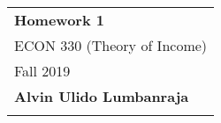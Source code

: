 \documentclass[letter,10pt]{article}
\begin{document}
\thispagestyle{empty} %
\begin{tabular}{p{17cm}} %
{\large \bf Homework 1} \\
ECON 330 (Theory of Income) \\ Fall 2019  \\ {\bf{Alvin Ulido Lumbanraja}}\\
\hline %
\\
\end{tabular} %
\vspace*{0.3cm} %
\end{document}
